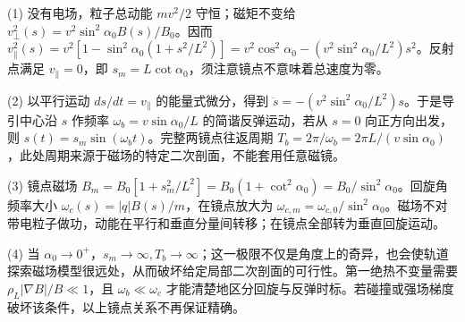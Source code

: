(1) 没有电场，粒子总动能 \(mv^2/2\) 守恒；磁矩不变给 \(v_\perp^2(s)=v^2\sin^2\alpha_0 B(s)/B_0\)。因而 \(v_\parallel^2(s)=v^2[1-\sin^2\alpha_0(1+s^2/L^2)]=v^2\cos^2\alpha_0-(v^2\sin^2\alpha_0/L^2)s^2\)。反射点满足 \(v_\parallel=0\)，即 \(s_m=L\cot\alpha_0\)，须注意镜点不意味着总速度为零。

(2) 以平行运动 \(ds/dt=v_\parallel\) 的能量式微分，得到 \(\ddot s=-(v^2\sin^2\alpha_0/L^2)s\)。于是导引中心沿 \(s\) 作频率 \(\omega_b=v\sin\alpha_0/L\) 的简谐反弹运动，若从 \(s=0\) 向正方向出发，则 \(s(t)=s_m\sin(\omega_b t)\)。完整两镜点往返周期 \(T_b=2\pi/\omega_b=2\pi L/(v\sin\alpha_0)\)，此处周期来源于磁场的特定二次剖面，不能套用任意磁镜。

(3) 镜点磁场 \(B_m=B_0[1+s_m^2/L^2]=B_0(1+\cot^2\alpha_0)=B_0/\sin^2\alpha_0\)。回旋角频率大小 \(\omega_c(s)=|q|B(s)/m\)，在镜点放大为 \(\omega_{c,m}=\omega_{c,0}/\sin^2\alpha_0\)。磁场不对带电粒子做功，动能在平行和垂直分量间转移；在镜点全部转为垂直回旋运动。

(4) 当 \(\alpha_0\to0^+\)，\(s_m\to\infty,T_b\to\infty\)；这一极限不仅是角度上的奇异，也会使轨道探索磁场模型很远处，从而破坏给定局部二次剖面的可行性。第一绝热不变量需要 \(\rho_L|\nabla B|/B\ll1\)，且 \(\omega_b\ll\omega_c\) 才能清楚地区分回旋与反弹时标。若碰撞或强场梯度破坏该条件，以上镜点关系不再保证精确。
